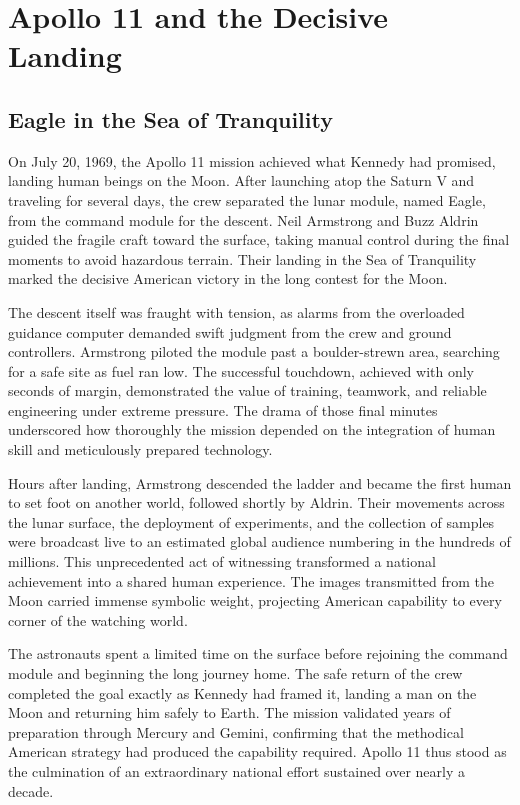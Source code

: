 \section{Apollo 11 and the Decisive Landing}

\subsection{Eagle in the Sea of Tranquility}
On July 20, 1969, the Apollo 11 mission achieved what Kennedy had promised, landing human beings on the Moon. After launching atop the Saturn V and traveling for several days, the crew separated the lunar module, named Eagle, from the command module for the descent. Neil Armstrong and Buzz Aldrin guided the fragile craft toward the surface, taking manual control during the final moments to avoid hazardous terrain. Their landing in the Sea of Tranquility marked the decisive American victory in the long contest for the Moon.

The descent itself was fraught with tension, as alarms from the overloaded guidance computer demanded swift judgment from the crew and ground controllers. Armstrong piloted the module past a boulder-strewn area, searching for a safe site as fuel ran low. The successful touchdown, achieved with only seconds of margin, demonstrated the value of training, teamwork, and reliable engineering under extreme pressure. The drama of those final minutes underscored how thoroughly the mission depended on the integration of human skill and meticulously prepared technology.

Hours after landing, Armstrong descended the ladder and became the first human to set foot on another world, followed shortly by Aldrin. Their movements across the lunar surface, the deployment of experiments, and the collection of samples were broadcast live to an estimated global audience numbering in the hundreds of millions. This unprecedented act of witnessing transformed a national achievement into a shared human experience. The images transmitted from the Moon carried immense symbolic weight, projecting American capability to every corner of the watching world.

The astronauts spent a limited time on the surface before rejoining the command module and beginning the long journey home. The safe return of the crew completed the goal exactly as Kennedy had framed it, landing a man on the Moon and returning him safely to Earth. The mission validated years of preparation through Mercury and Gemini, confirming that the methodical American strategy had produced the capability required. Apollo 11 thus stood as the culmination of an extraordinary national effort sustained over nearly a decade.

